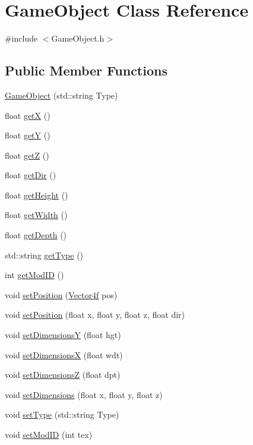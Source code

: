 \hypertarget{class_game_object}{}\section{Game\+Object Class Reference}
\label{class_game_object}


{\ttfamily \#include $<$Game\+Object.\+h$>$}

\subsection*{Public Member Functions}
\begin{DoxyCompactItemize}
\item 
\hyperlink{class_game_object_aec90b8f9ecec149059f836085d2e08d1}{Game\+Object} (std\+::string Type)
\item 
float \hyperlink{class_game_object_a4e944ae43980e9ada64b6745ab625648}{get\+X} ()
\item 
float \hyperlink{class_game_object_a6fcc29a31729e1bd7bfa24795a99f7f7}{get\+Y} ()
\item 
float \hyperlink{class_game_object_ad2c0bc08fd8754102ca9a7aee03bc7d8}{get\+Z} ()
\item 
float \hyperlink{class_game_object_a2e3331b475c5efa5dc14d94b8b8ca99e}{get\+Dir} ()
\item 
float \hyperlink{class_game_object_ac92c2ac682f12271dc3264bf5926222e}{get\+Height} ()
\item 
float \hyperlink{class_game_object_af20cde3a6ee2a92f030268b3dedafa9c}{get\+Width} ()
\item 
float \hyperlink{class_game_object_a14ea0554a87be6e9706de78025f17bb5}{get\+Depth} ()
\item 
std\+::string \hyperlink{class_game_object_a221b397f8a7c7d0c697f8b8e5e92a56b}{get\+Type} ()
\item 
int \hyperlink{class_game_object_a7abcdc36eb4494b0548e51a7ad4d4e81}{get\+Mod\+I\+D} ()
\item 
void \hyperlink{class_game_object_a385e44bc65891b3777b370d269199980}{set\+Position} (\hyperlink{_game_object_8h_a0414e274dcb6af163e27af46c6787a2a}{Vector4f} pos)
\item 
void \hyperlink{class_game_object_aeb52216b666d28387918200c40aabd5c}{set\+Position} (float x, float y, float z, float dir)
\item 
void \hyperlink{class_game_object_ad5d24c1a2c8ad896bda1713f64071b59}{set\+Dimensions\+Y} (float hgt)
\item 
void \hyperlink{class_game_object_a4b61bb99a40a543c68bd08ff299f0550}{set\+Dimensions\+X} (float wdt)
\item 
void \hyperlink{class_game_object_a611aee04a9af460e86977cad48c71f21}{set\+Dimensions\+Z} (float dpt)
\item 
void \hyperlink{class_game_object_a83aabfb2667d8f21df4e085e1d214a9c}{set\+Dimensions} (float x, float y, float z)
\item 
void \hyperlink{class_game_object_aaebbf84616b8aa8cc8999f84c148c6c9}{set\+Type} (std\+::string Type)
\item 
void \hyperlink{class_game_object_a5b24ffc750299e20b100e92d1386f3d4}{set\+Mod\+I\+D} (int tex)
\end{DoxyCompactItemize}


